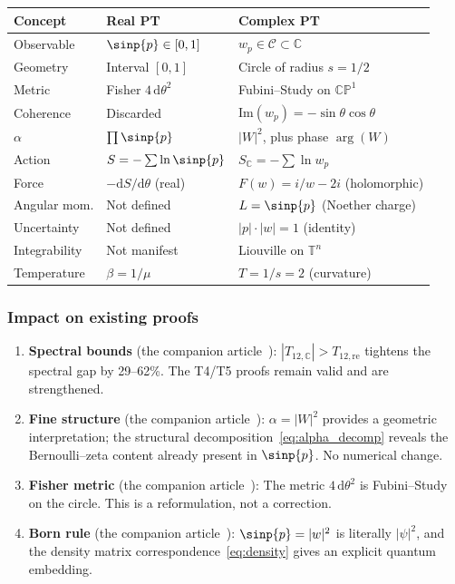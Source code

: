 \documentclass[12pt,a4paper]{article}
\begin{document}
\begin{center}
\begin{tabular}{lll}
\toprule
\textbf{Concept} & \textbf{Real PT} & \textbf{Complex PT} \\
\midrule
Observable      & $\sinp{p} \in [0,1]$    & $w_p \in \mathcal{C} \subset \mathbb{C}$ \\
Geometry        & Interval $[0,1]$        & Circle of radius $s = 1/2$ \\
Metric          & Fisher $4\,\mathrm{d}\theta^2$ & Fubini--Study on $\mathbb{CP}^1$ \\
Coherence       & Discarded               & $\mathrm{Im}(w_p) = -\sin\theta\cos\theta$ \\
$\alpha$        & $\prod\sinp{p}$         & $|W|^2$, plus phase $\arg(W)$ \\
Action          & $S = -\sum\ln\sinp{p}$  & $S_{\mathbb{C}} = -\sum\ln w_p$ \\
Force           & $-\mathrm{d}S/\mathrm{d}\theta$ (real) & $F(w) = i/w - 2i$ (holomorphic) \\
Angular mom.    & Not defined             & $L = \sinp{p}$ (Noether charge) \\
Uncertainty     & Not defined             & $|p|\cdot|w| = 1$ (identity) \\
Integrability   & Not manifest            & Liouville on $\mathbb{T}^n$ \\
Temperature     & $\beta = 1/\mu$         & $T = 1/s = 2$ (curvature) \\
\bottomrule
\end{tabular}
\end{center}

\subsubsection{Impact on existing proofs}

\begin{enumerate}[nosep]
\item \textbf{Spectral bounds} (the companion article~\cite{companion_M3}):
  $|T_{12,\mathbb{C}}| > T_{12,\mathrm{re}}$ tightens the spectral gap
  by 29--62\%. The T4/T5 proofs remain valid and are strengthened.
\item \textbf{Fine structure} (the companion article~\cite{companion_physics}):
  $\alpha = |W|^2$ provides a geometric interpretation; the structural
  decomposition~\eqref{eq:alpha_decomp} reveals the Bernoulli--zeta
  content already present in $\sinp{p}$. No numerical change.
\item \textbf{Fisher metric} (the companion article~\cite{companion_M2}):
  The metric $4\,\mathrm{d}\theta^2$ is Fubini--Study on the circle.
  This is a reformulation, not a correction.
\item \textbf{Born rule} (the companion article~\cite{companion_physics}):
  $\sinp{p} = |w|^2$ is literally $|\psi|^2$, and the density matrix
  correspondence~\eqref{eq:density} gives an explicit quantum
  embedding.
\end{enumerate}
\end{document}
